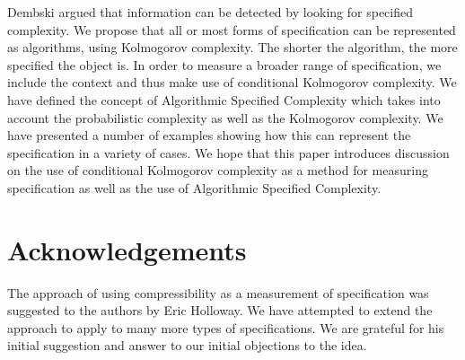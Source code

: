 Dembski argued that information can be detected by looking for specified complexity.
We propose that all or most forms of specification can be represented as algorithms, using Kolmogorov complexity.
The shorter the algorithm, the more specified the object is.
In order to measure a broader range of specification, we include the context and thus make use of conditional Kolmogorov complexity.
We have defined the concept of Algorithmic Specified Complexity which takes into account the probabilistic complexity as well as the Kolmogorov complexity. 
We have presented a number of examples showing how this can represent the specification in a variety of cases.
We hope that this paper introduces discussion on the use of conditional Kolmogorov complexity as a method for measuring specification as well as the use of Algorithmic Specified Complexity.

\section*{Acknowledgements}

The approach of using compressibility as a measurement of specification was suggested to the authors by Eric Holloway.
We have attempted to extend the approach to apply to many more types of specifications.
We are grateful for his initial suggestion and answer to our initial objections to the idea.




